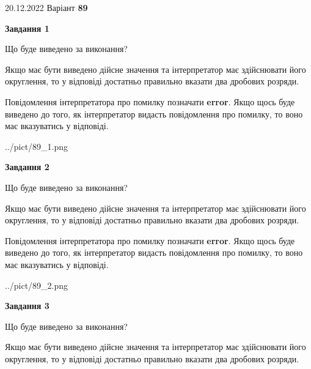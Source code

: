 \documentclass[12pt, ukrainian]{article}
\begin{document}
{20.12.2022 Варіант \No \textbf { 89 }\par}
{
\begin {Large}

{\begin {center}\textbf{Завдання 1}\end {center}}\par
Що буде виведено за виконання? \par

Якщо має бути виведено дійсне значення та інтерпретатор має здійснювати його округлення, 
то у відповіді достатньо правильно вказати два дробових розряди.

Повідомлення інтерпретатора про помилку позначати \textbf{error}.
Якщо щось буде виведено до того, як інтерпретатор видасть повідомлення про помилку, 
то воно має вказуватись у відповіді. \par

\begin{center}
	{../pict/89_1.png}
\end{center}
\newpage

{\begin {center}\textbf{Завдання 2}\end {center}}\par
Що буде виведено за виконання? \par

Якщо має бути виведено дійсне значення та інтерпретатор має здійснювати його округлення, 
то у відповіді достатньо правильно вказати два дробових розряди.

Повідомлення інтерпретатора про помилку позначати \textbf{error}.
Якщо щось буде виведено до того, як інтерпретатор видасть повідомлення про помилку, 
то воно має вказуватись у відповіді. \par

\begin{center}
	{../pict/89_2.png}
\end{center}
\newpage

{\begin {center}\textbf{Завдання 3}\end {center}}\par
Що буде виведено за виконання? \par

Якщо має бути виведено дійсне значення та інтерпретатор має здійснювати його округлення, 
то у відповіді достатньо правильно вказати два дробових розряди.


\end{Large}}
\end{document}
